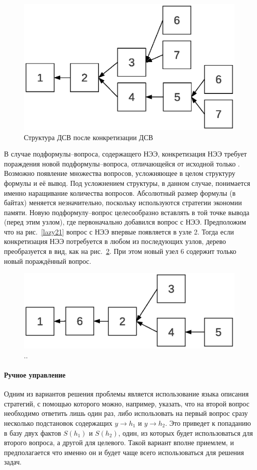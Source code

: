\begin{figure}[h]
	\centering
	\includegraphics[width=0.5\linewidth]{pics/Lazy22.eps}
	\caption{Структура ДСВ после конкретизации ДСВ}
	\label{lazy22}
\end{figure}

В случае подформулы--вопроса, содержащего НЭЭ, конкретизация НЭЭ требует пораждения новой подформулы--вопроса, отличающейся от исходной только . Возможно появление множества вопросов, усложняющее в целом структуру формулы и её вывод. Под усложнением структуры, в данном случае, понимается именно наращивание количества вопросов. Абсолютный размер формулы (в байтах) меняется незначительно, поскольку используются стратегии экономии памяти. Новую подформулу--вопрос целесообразно вставлять в той точке вывода (перед этим узлом), где первоначально добавился вопрос с НЭЭ. Предположим что на рис.~\ref{lazy21} вопрос с НЭЭ впервые появляется в узле 2. Тогда если конкретизация НЭЭ потребуется в любом из последующих узлов, дерево преобразуется в вид, как на рис.~\ref{lazy23}. При этом новый узел 6 содержит только новый пораждённый вопрос.
\begin{figure}[h]
	\centering
	\includegraphics[width=0.5\linewidth]{pics/Lazy23.eps}
	\caption{..}
	\label{lazy23}
\end{figure}

\paragraph{Ручное управление}
Одним из вариантов решения проблемы является использование языка описания стратегий, с помощью которого можно, например, указать, что на второй вопрос необходимо ответить лишь один раз, либо использовать на первый вопрос сразу несколько подстановок содержащих $y\rightarrow h_1$ и $y\rightarrow h_2$. Это приведет к попаданию в базу двух фактов $S(h_1)$ и $S(h_2)$, один, из которых будет использоваться для второго вопроса, а другой для целевого. Такой вариант вполне приемлем, и предполагается что именно он и будет чаще всего использоваться для решения задач.  

